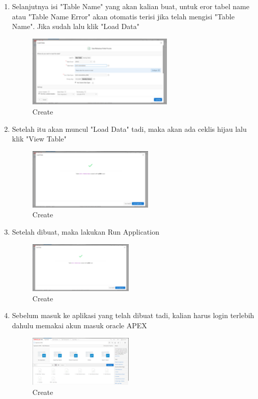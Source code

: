 \documentclass{article}
\begin{document}
\begin{enumerate}
    \item Selanjutnya isi "Table Name" yang akan kalian buat, untuk eror tabel name atau "Table Name Error" akan otomatis terisi jika telah mengisi "Table Name". Jika sudah lalu klik "Load Data"
    \begin{figure}[h]
	\centering
	\includegraphics[width=7cm]{Figure/ID.png}
	\caption{Create}
	\label{fig:gambar}
	\end{figure}
	
    \item Setelah itu akan muncul "Load Data" tadi, maka akan ada ceklis hijau lalu klik "View Table"
    \begin{figure}[h]
	\centering
	\includegraphics[width=6cm]{Figure/CA.png}
	\caption{Create}
	\label{fig:gambar}
	\end{figure}
	
	    \item Setelah dibuat, maka lakukan Run Application
    \begin{figure}[h]
	\centering
	\includegraphics[width=5cm]{Figure/CA.png}
	\caption{Create}
	\label{fig:gambar}
	\end{figure}
    
    \item Sebelum masuk ke aplikasi yang telah dibuat tadi, kalian harus login terlebih dahulu memakai akun masuk oracle APEX
    \begin{figure}[h]
	\centering
	\includegraphics[width=5cm]{Figure/RA.png}
	\caption{Create}
	\label{fig:gambar}
	\end{figure}
    

\end{enumerate}
\end{document}
